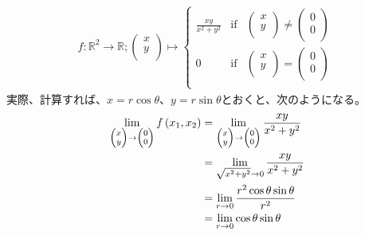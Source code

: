 \documentclass[dvipdfmx]{jsarticle}
\begin{document}
\begin{align*}
f:\mathbb{R}^{2} \rightarrow \mathbb{R};\begin{pmatrix}
x \\
y \\
\end{pmatrix} \mapsto \left\{ \begin{matrix}
\frac{xy}{x^{2} + y^{2}} & \mathrm{if} & \begin{pmatrix}
x \\
y \\
\end{pmatrix} \neq \begin{pmatrix}
0 \\
0 \\
\end{pmatrix} \\
0 & \mathrm{if} & \begin{pmatrix}
x \\
y \\
\end{pmatrix} = \begin{pmatrix}
0 \\
0 \\
\end{pmatrix} \\
\end{matrix} \right.\ 
\end{align*}
実際、計算すれば、$x = r\cos\theta$、$y = r\sin\theta$とおくと、次のようになる。
\begin{align*}
\lim_{\scriptsize \begin{pmatrix}
x \\
y \\
\end{pmatrix} \rightarrow \begin{pmatrix}
0 \\
0 \\
\end{pmatrix}}{f\left( x_{1},x_{2} \right)} &= \lim_{\scriptsize \begin{pmatrix}
x \\
y \\
\end{pmatrix} \rightarrow \begin{pmatrix}
0 \\
0 \\
\end{pmatrix}}\frac{xy}{x^{2} + y^{2}}\\
&= \lim_{\sqrt{x^{2} + y^{2}} \rightarrow 0}\frac{xy}{x^{2} + y^{2}}\\
&= \lim_{r \rightarrow 0}\frac{r^{2}\cos\theta\sin\theta}{r^{2}}\\
&= \lim_{r \rightarrow 0}{\cos\theta\sin\theta}
\end{align*}
\end{document}
